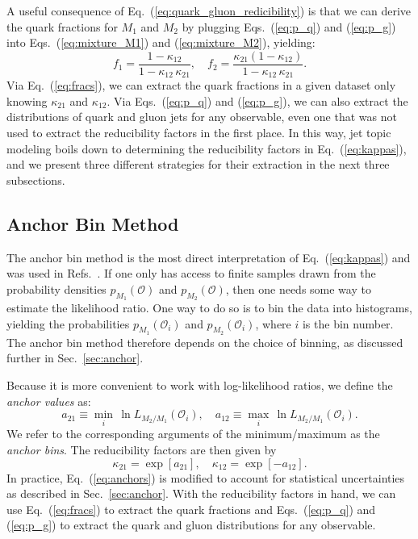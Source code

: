 \documentclass[aps,prd,twocolumn,preprintnumbers,nofootinbib,longbibliography,floatfix]{revtex4-1}
\DeclareRobustCommand{\Sec}[1]{Sec.~\ref{#1}}
\DeclareRobustCommand{\Eq}[1]{Eq.~(\ref{#1})}
\DeclareRobustCommand{\Eqs}[2]{Eqs.~(\ref{#1}) and (\ref{#2})}
\DeclareRobustCommand{\Refs}[1]{Refs.~\cite{#1}}
\newcommand{\figO}{\mathcal{O}}
\newcommand{\ka}{\kappa}
\begin{document}
A useful consequence of \Eq{eq:quark_gluon_redicibility} is that we can derive the quark fractions for $M_1$ and $M_2$ by plugging \Eqs{eq:p_q}{eq:p_g} into \Eqs{eq:mixture_M1}{eq:mixture_M2}, yielding:
%
\begin{equation}
\label{eq:fracs}
f_1=\frac{1-\ka_{12}}{1-\ka_{12}\,\ka_{21}},\quad f_2=\frac{\ka_{21}\left(1-\ka_{12}\right)}{1-\ka_{12}\,\ka_{21}}.
\end{equation}
%
Via \Eq{eq:fracs}, we can extract the quark fractions in a given dataset only knowing $\ka_{21}$ and $\ka_{12}$.
%
Via \Eqs{eq:p_q}{eq:p_g}, we can also extract the distributions of quark and gluon jets for any observable, even one that was not used to extract the reducibility factors in the first place.
%
In this way, jet topic modeling boils down to determining the reducibility factors in \Eq{eq:kappas}, and we present three different strategies for their extraction in the next three subsections.








\subsection{Anchor Bin Method}
\label{subsection:bin_methods}


The anchor bin method is the most direct interpretation of \Eq{eq:kappas} and was used in \Refs{Metodiev:2018ftz,Komiske:2018vkc,ATLAS:2019rqw,radha_phdthesis}.
%
If one only has access to finite samples drawn from the probability densities $p_{M_1}(\figO)$ and $p_{M_2}(\figO)$, then one needs some way to estimate the likelihood ratio.
%
One way to do so is to bin the data into histograms, yielding the probabilities $p_{M_1}(\figO_i)$ and $p_{M_2}(\figO_i)$, where $i$ is the bin number.
%
The anchor bin method therefore depends on the choice of binning, as discussed further in \Sec{sec:anchor}.


Because it is more convenient to work with log-likelihood ratios, we define the \emph{anchor values} as:
%
\begin{equation}
\label{eq:anchors}
a_{21} \equiv \min_{i}\, \ln L_{{M_2}/{M_1}}(\figO_i), \quad a_{12} \equiv \max_{i}\, \ln L_{{M_2}/{M_1}}(\figO_i).
\end{equation}
%
We refer to the corresponding arguments of the minimum/maximum as the \emph{anchor bins}. 
%
The reducibility factors are then given by
%
\begin{equation}
\label{eq:kappasanchor}
\ka_{21} = \exp[a_{21}], \quad \ka_{12} = \exp[-a_{12}].
\end{equation}
%
In practice, \Eq{eq:anchors} is modified to account for statistical uncertainties as described in \Sec{sec:anchor}.
%
With the reducibility factors in hand, we can use \Eq{eq:fracs} to extract the quark fractions and \Eqs{eq:p_q}{eq:p_g} to extract the quark and gluon distributions for any observable.
\end{document}
